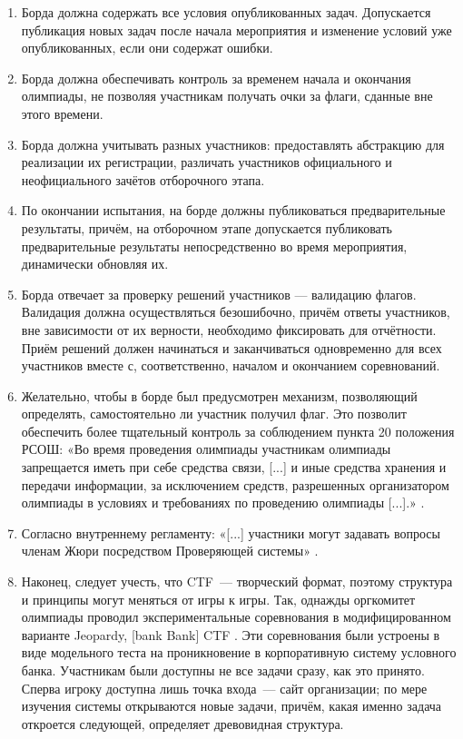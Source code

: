 \begin{enumerate}

\item
  Борда должна содержать все условия опубликованных задач. Допускается публикация новых задач после начала мероприятия и изменение условий уже опубликованных, если они содержат ошибки.

\item Борда должна обеспечивать контроль за временем начала и окончания олимпиады, не позволяя участникам получать очки за флаги, сданные вне этого времени.

\item Борда должна учитывать разных участников: предоставлять абстракцию для реализации их регистрации, различать участников официального и неофициального зачётов отборочного этапа.

\item По окончании испытания, на борде должны публиковаться предварительные результаты, причём, на отборочном этапе допускается публиковать предварительные результаты непосредственно во время мероприятия, динамически обновляя их.

\item
  Борда отвечает за проверку решений участников — валидацию флагов. Валидация должна осуществляться безошибочно, причём ответы участников, вне зависимости от их верности, необходимо фиксировать для отчётности. Приём решений должен начинаться и заканчиваться одновременно для всех участников вместе с, соответственно, началом и окончанием соревнований.

\item
  Желательно, чтобы в борде был предусмотрен механизм, позволяющий определять, самостоятельно ли участник получил флаг. Это позволит обеспечить более тщательный контроль за соблюдением пункта 20 положения РСОШ: «Во время проведения олимпиады участникам олимпиады запрещается иметь при себе средства связи, [...] и иные средства хранения и передачи информации, за исключением средств, разрешенных организатором олимпиады в условиях и требованиях по проведению олимпиады [...].» \cite{Rosolymp}.

\item Согласно внутреннему регламенту: «[...] участники могут задавать вопросы членам Жюри посредством Проверяющей системы» \cite{Olymp}.

\item Наконец, следует учесть, что CTF~--- творческий формат, поэтому структура и принципы могут меняться от игры к игры. Так, однажды оргкомитет олимпиады проводил экспериментальные соревнования в модифицированном варианте Jeopardy, [bank Bank] CTF \cite{Bankbank}. Эти соревнования были устроены в виде модельного теста на проникновение в корпоративную систему условного банка. Участникам были доступны не все задачи сразу, как это принято. Сперва игроку доступна лишь точка входа~--- сайт организации; по мере изучения системы открываются новые задачи, причём, какая именно задача откроется следующей, определяет древовидная структура.

\end{enumerate}

